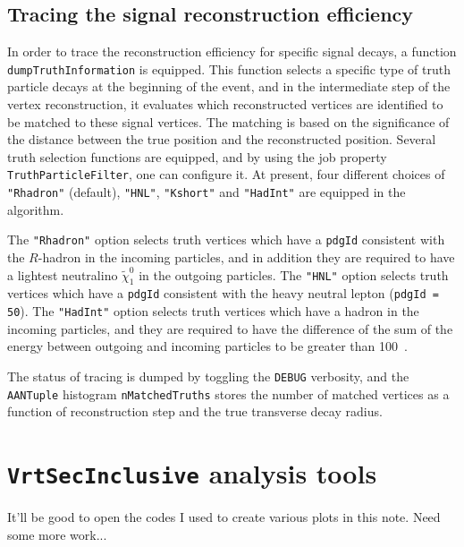 \documentclass[NOTE, atlasdraft=true, texlive=2018, UKenglish]{\ATLASLATEXPATH atlasdoc}
\begin{document}
\subsection{Tracing the signal reconstruction efficiency}
In order to trace the reconstruction efficiency for specific signal decays, a function {\tt dumpTruthInformation} is equipped. This function selects a specific type of truth particle decays at the beginning of the event, and in the intermediate step of the vertex reconstruction, it evaluates which reconstructed vertices are identified to be matched to these signal vertices. The matching is based on the significance of the distance between the true position and the reconstructed position. Several truth selection functions are equipped, and by using the job property {\tt TruthParticleFilter}, one can configure it. At present, four different choices of {\tt "Rhadron"} (default), {\tt "HNL"}, {\tt "Kshort"} and {\tt "HadInt"} are equipped in the algorithm.

The {\tt "Rhadron"} option selects truth vertices which have a {\tt pdgId} consistent with the $R$-hadron in the incoming particles, and in addition they are required to have a lightest neutralino $\tilde{\chi}_{1}^{0}$ in the outgoing particles. The {\tt "HNL"} option selects truth vertices which have a {\tt pdgId} consistent with the heavy neutral lepton ({\tt pdgId = 50}). The {\tt "HadInt"} option selects truth vertices which have a hadron in the incoming particles, and they are required to have the difference of the sum of the energy between outgoing and incoming particles to be greater than 100~\MeV.

The status of tracing is dumped by toggling the {\tt DEBUG} verbosity, and the {\tt AANTuple} histogram {\tt nMatchedTruths} stores the number of matched vertices as a function of reconstruction step and the true transverse decay radius.

\section{{\tt VrtSecInclusive} analysis tools}
It'll be good to open the codes I used to create various plots in this note. Need some more work...
\end{document}
